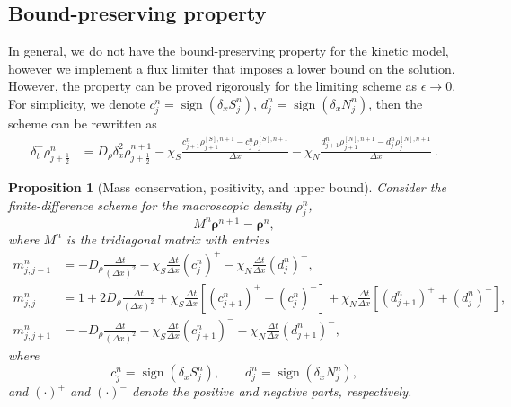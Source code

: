 \documentclass[11pt,twoside]{article}
\theoremstyle{nonumberplain}
\DeclareMathOperator{\sign}{sign}
\newtheorem{proposition}[theorem]{Proposition}
\newcommand{\brho}{\boldsymbol{\rho}}
\begin{document}
\subsection{Bound-preserving property}
{In general, we do not have the bound-preserving property for the kinetic model, however we implement a flux limiter that imposes a lower bound on the solution. However, the property can be proved rigorously for the limiting scheme as $\epsilon\to 0$. 
For simplicity, we denote $c_j^n = \sign(\delta_x S_{j}^n)$, $d_j^n = \sign(\delta_x N_{j}^n)$, then the scheme can be rewritten as 
\begin{align*}
    \delta_t^+\rho_{j+\frac{1}{2}}^n &= D_\rho \delta_x^2 \rho_{j+\frac12}^{n+1} 
    - \chi_S \frac{c_{j+1}^n \rho^{[S],n+1}_{j+1} - c_{j}^n \rho^{[S],n+1}_{j}}{\Delta x} 
    - \chi_N \frac{d_{j+1}^n \rho^{[N],n+1}_{j+1} - d_{j}^n \rho^{[N],n+1}_{j}}{\Delta x}\ .
\end{align*}

\begin{proposition}[Mass conservation, positivity, and upper bound]
Consider the finite-difference scheme for the macroscopic density 
$\rho_j^n$,
\[
M^n \brho^{n+1} = \brho^n ,
\]
where $M^n$ is the tridiagonal matrix with entries
\begin{align*}
m_{j,j-1}^n &= - D_\rho \frac{\Delta t}{(\Delta x)^2}
             - \chi_S \frac{\Delta t}{\Delta x} (c_j^n)^{+}
             - \chi_N \frac{\Delta t}{\Delta x} (d_j^n)^{+}, \\
m_{j,j}^n   &= 1 + 2 D_\rho \frac{\Delta t}{(\Delta x)^2}
             + \chi_S \frac{\Delta t}{\Delta x} \left[(c_{j+1}^n)^{+} + (c_j^n)^{-}\right]
             + \chi_N \frac{\Delta t}{\Delta x} \left[(d_{j+1}^n)^{+} + (d_j^n)^{-}\right], \\
m_{j,j+1}^n &= - D_\rho \frac{\Delta t}{(\Delta x)^2}
             - \chi_S \frac{\Delta t}{\Delta x} (c_{j+1}^n)^{-}
             - \chi_N \frac{\Delta t}{\Delta x} (d_{j+1}^n)^{-},
\end{align*}
where 
\[c_j^n = \operatorname{sign}(\delta_x S_j^n),
\qquad
d_j^n = \operatorname{sign}(\delta_x N_j^n),
\]
and $(\cdot)^{+}$ and $(\cdot)^{-}$ denote the positive and negative parts, respectively.


\end{proposition}}
\end{document}
